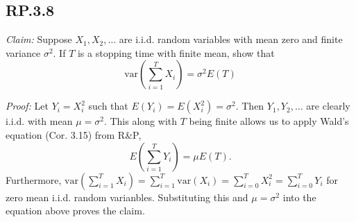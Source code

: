 \documentclass[10pt]{article}
\newcommand{\var}{\text{var}}
\begin{document}
\subsection*{RP.3.8}
\textit{Claim:} Suppose $X_1,X_2,\dots$ are i.i.d. random variables
with mean zero and finite variance $\sigma^2$.
If $T$ is a stopping time with finite mean, show that
\begin{equation*}
  \var(\sum_{i=1}^T X_i) = \sigma^2 E(T)
\end{equation*}

\textit{Proof:}
Let $Y_i = X_i^2$ such that $E(Y_i) = E(X_i^2)  = \sigma^2$. 
Then $Y_1, Y_2, \dots$ are clearly i.i.d. with mean $\mu = \sigma^2$. 
This along with $T$ being finite allows us to apply 
Wald's equation (Cor. 3.15) from R\&P,
\begin{equation*}
  E(\sum_{i=1}^T Y_i) = \mu E(T).
\end{equation*}
Furthermore, $\var(\sum_{i=1}^T X_i) = \sum_{i=1}^T \var(X_i) 
= \sum_{i=0}^T X_i^2 = \sum_{i=0}^T Y_i$ 
for zero mean i.i.d. random varianbles. Substituting this and
$\mu = \sigma^2$ into the equation above proves the claim.
\end{document}
